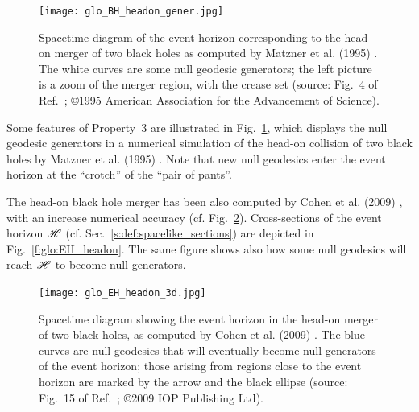 \begin{figure}
\centerline{\texttt{[image: glo\_BH\_headon\_gener.jpg]}}
\caption[]{\label{f:glo:BH_headon_gener} \footnotesize
Spacetime diagram of the event horizon corresponding to the head-on merger of
two black holes as computed by Matzner et al. (1995) \cite{Matzn_al95}. The
white curves are some null geodesic generators; the left picture is a zoom of
the merger region, with the crease set
(source: Fig.~4 of Ref.~\cite{Matzn_al95}; \copyright 1995 American Association for the Advancement of Science).}
\end{figure}



Some features of Property~3 are illustrated in Fig.~\ref{f:glo:BH_headon_gener},
which displays the null geodesic generators in a numerical simulation
of the head-on collision of two black holes by Matzner et al. (1995) \cite{Matzn_al95}.
Note that new null geodesics enter the event horizon at the ``crotch'' of the
``pair of pants''.

The head-on black hole merger has been also computed by Cohen et al. (2009) \cite{CohenPS09}, with an increase numerical accuracy (cf. Fig.~\ref{f:glo:EH_headon_3d}).
Cross-sections of the event horizon $\mathscr{H}$ (cf. Sec.~\ref{s:def:spacelike_sections})
are depicted in Fig.~\ref{f:glo:EH_headon}. The same figure shows also how
some null geodesics will reach $\mathscr{H}$ to become null generators.


\begin{figure}
\centerline{\texttt{[image: glo\_EH\_headon\_3d.jpg]}}
\caption[]{\label{f:glo:EH_headon_3d} \footnotesize
Spacetime diagram showing the event horizon in the head-on merger of
two black holes, as computed by Cohen et al. (2009) \cite{CohenPS09}.
The blue curves are null geodesics that will eventually become null generators
of the event horizon; those arising from regions close to the event horizon
are marked by the arrow and the black ellipse
(source: Fig.~15 of Ref.~\cite{CohenPS09}; \copyright 2009 IOP Publishing Ltd).}
\end{figure}

